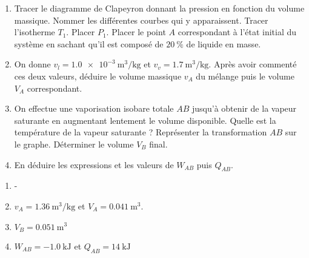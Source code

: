 \begin{enumerate}
	\item Tracer le diagramme de Clapeyron donnant la pression en fonction du volume massique. Nommer les différentes courbes qui y apparaissent. Tracer l'isotherme $T_1$. Placer $P_1$. Placer le point $A$ correspondant à l'état initial du système en sachant qu'il est composé de $\SI{20}{\percent}$ de liquide en masse.
	\item On donne $v_l = \SI{1.0e-3}{\meter\cubed\per\kilogram}$ et $v_v = \SI{1.7}{\meter\cubed\per\kilogram}$. Après avoir commenté ces deux valeurs, déduire le volume massique $v_A$ du mélange puis le volume $V_A$ correspondant.
	\item On effectue une vaporisation isobare totale $AB$ jusqu'à obtenir de la vapeur saturante en augmentant lentement le volume disponible. Quelle est la température de la vapeur saturante ? Représenter la transformation $AB$ sur le graphe. Déterminer le volume $V_B$ final.
	\item En déduire les expressions et les valeurs de $W_{AB}$ puis $Q_{AB}$.
\end{enumerate}

\begin{enumerate}
	\item -
	\item $v_A = \SI{1.36}{\meter\cubed\per\kilogram}$ et $V_A = \SI{0.041}{\meter\cubed}$.
	\item $V_B = \SI{0.051}{\meter\cubed}$
	\item $W_{AB} = \SI{-1.0}{\kilo\joule}$ et $Q_{AB} = \SI{14}{\kilo\joule}$ 
\end{enumerate}
